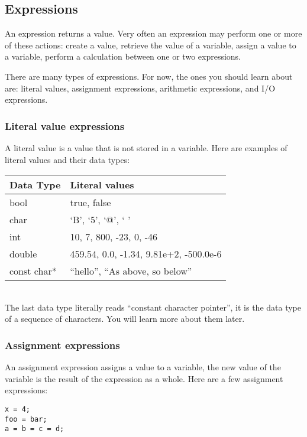 \documentclass[a4paper,12pt]{article}
\begin{document}
\subsection*{Expressions}

An expression returns a value. Very often an expression may perform one or more of these actions: create a value, retrieve the value of a variable, assign a value to a variable, perform a calculation between one or two expressions. 

There are many types of expressions. For now, the ones you should learn about are: literal values, assignment expressions, arithmetic expressions, and I/O expressions. 

\subsubsection*{Literal value expressions}

A literal value is a value that is not stored in a variable. Here are examples of literal values and their data types: \\

\begin{tabular}{|l|l|}
\hline
Data Type & Literal values \\
\hline
bool & true, false \\
\hline
char & `B', `5', `@', ` ' \\
\hline
int & 10, 7, 800, -23, 0, -46 \\
\hline
double & 459.54, 0.0, -1.34, 9.81e+2, -500.0e-6 \\
\hline
const char* & ``hello'', ``As above, so below'' \\
\hline
\end{tabular} \\

The last data type literally reads ``constant character pointer'', it is the data type of a sequence of characters. You will learn more about them later.

\subsubsection*{Assignment expressions}

An assignment expression assigns a value to a variable, the new value of the variable is the result of the expression as a whole. Here are a few assignment expressions:

\begin{lstlisting}[caption=Examples of assignment expressions]
x = 4;
foo = bar;
a = b = c = d;
\end{lstlisting}
\end{document}
